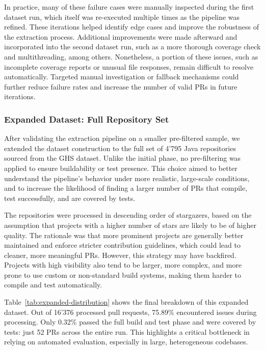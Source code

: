 In practice, many of these failure cases were manually inspected during the first dataset run, which
itself was re-executed multiple times as the pipeline was refined. These iterations helped identify
edge cases and improve the robustness of the extraction process. Additional improvements were made
afterward and incorporated into the second dataset run, such as a more thorough coverage check and
multithreading, among others. Nonetheless, a portion of these issues, such as incomplete
coverage reports or unusual file responses, remain difficult to resolve automatically. Targeted
manual investigation or fallback mechanisms could further reduce failure rates and increase the
number of valid PRs in future iterations.

\subsubsection{Expanded Dataset: Full Repository Set}
\label{sec:stat-expanded}

After validating the extraction pipeline on a smaller pre-filtered sample, we extended the dataset
construction to the full set of 4'795 Java repositories sourced from the GHS dataset. Unlike the
initial phase, no pre-filtering was applied to ensure buildability or test presence. This choice
aimed to better understand the pipeline’s behavior under more realistic, large-scale conditions, and
to increase the likelihood of finding a larger number of PRs that compile, test successfully, and
are covered by tests.

The repositories were processed in descending order of stargazers, based on the assumption that
projects with a higher number of stars are likely to be of higher quality. The rationale was that
more prominent projects are generally better maintained and enforce stricter contribution
guidelines, which could lead to cleaner, more meaningful PRs. However, this strategy may have
backfired. Projects with high visibility also tend to be larger, more complex, and more prone to use
custom or non-standard build systems, making them harder to compile and test automatically.

Table~\ref{tab:expanded-distribution} shows the final breakdown of this expanded dataset. Out of
16'376 processed pull requests, 75.89\% encountered issues during processing. Only 0.32\% passed the
full build and test phase and were covered by tests: just 52 PRs across the entire run. This
highlights a critical bottleneck in relying on automated evaluation, especially in large,
heterogeneous codebases.

